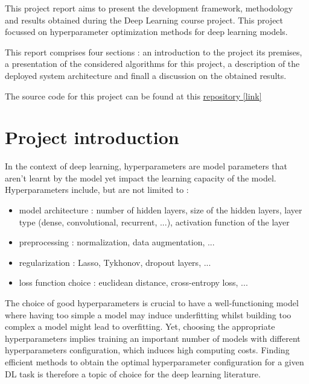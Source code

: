 \documentclass[a4 paper,11pt,2]{article}
\begin{document}


\tableofcontents
\newpage

This project report aims to present the development framework, methodology and
results obtained during the Deep Learning course project. This project focussed
on hyperparameter optimization methods for deep learning models.

This report comprises four sections : an introduction to the project its
premises, a presentation of the considered algorithms for this project, a
description of the deployed system architecture and finall a discussion on the
obtained results.

The source code for this project can be found at this \href{https://github.com/QuentinGoulas/Hyper-parameters-optimization.git}{repository [link]}

\section{Project introduction}
In the context of deep learning, hyperparameters are model parameters that
aren't learnt by the model yet impact the learning capacity of the model.
Hyperparameters include, but are not limited to :
\begin{itemize}
    \item model architecture : number of hidden layers, size of the hidden layers, layer
          type (dense, convolutional, recurrent, ...), activation function of the layer
    \item preprocessing : normalization, data augmentation, ...
    \item regularization : Lasso, Tykhonov, dropout layers, ...
    \item loss function choice : euclidean distance, cross-entropy loss, ...
\end{itemize}

The choice of good hyperparameters is crucial to have a well-functioning model
where having too simple a model may induce underfitting whilst building too
complex a model might lead to overfitting. Yet, choosing the appropriate
hyperparameters implies training an important number of models with different
hyperparameters configuration, which induces high computing costs. Finding
efficient methods to obtain the optimal hyperparameter configuration for a
given DL task is therefore a topic of choice for the deep learning literature.
\end{document}

